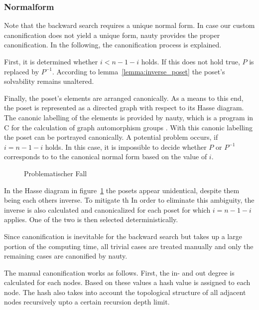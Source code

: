 \documentclass[10pt,journal,compsoc]{IEEEtran}
\begin{document}
\subsubsection{Normalform}
Note that the backward search requires a unique normal form. In case our custom canonification does not yield a unique form, nauty provides the proper canonification.
In the following, the canonification process is explained.

First, it is determined whether $i < n-1-i$ holds.
If this does not hold true, $P$ is replaced by $P^{-1}$.
According to lemma~\ref{lemma:inverse_poset} the poset's solvability remains unaltered.

Finally, the poset's elements are arranged canonically.
As a means to this end, the poset is represented as a directed graph with respect to its Hasse diagram.
The canonic labelling of the elements is provided by nauty, which is a program in C for the calculation of graph automorphism groups \cite{MCKAY201494}.
With this canonic labelling the poset can be portrayed canonically.
A potential problem occurs, if $i = n - 1 - i$ holds.
In this case, it is impossible to decide whether $P$ or $P^{-1}$ corresponds to
to the canonical normal form based on the value of $i$.

\begin{figure}
  
  \centering
  \caption{Problematischer Fall}
  \label{fig:backward_canonify_problematic}
\end{figure}

In the Hasse diagram in figure~\ref{fig:backward_canonify_problematic} the posets appear unidentical, despite them being each others inverse.
To mitigate th
In order to eliminate this ambiguity, the inverse is also calculated and canonicalized for each poset for which $i = n - 1 - i$ applies.
One of the two is then selected deterministically.

Since canonification is inevitable for the backward search but takes up a large portion of the computing time, all trivial cases are treated manually and only the remaining cases are canonified by nauty.

The manual canonification works as follows.
First, the in- and out degree is calculated for each nodes.
Based on these values a hash value is assigned to each node.
The hash also takes into account the topological structure of all adjacent nodes recursively upto a certain recursion depth limit.
\end{document}
